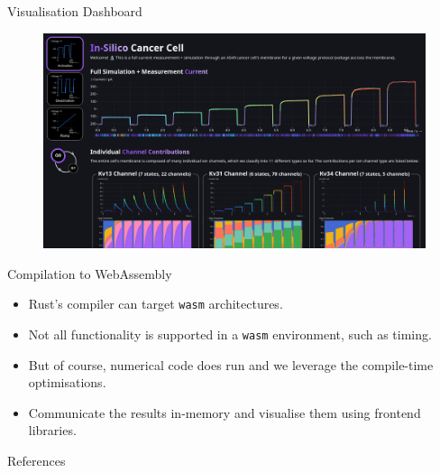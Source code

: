\documentclass[aspectratio=169, hyperref={colorlinks=true}]{beamer}
\begin{document}
  \begin{frame}{Visualisation Dashboard}
    \begin{figure}
      \includegraphics[width=0.7\linewidth]{../../figures/above-the-fold-screenshot.png}
    \end{figure}
  \end{frame}

  \begin{frame}{Compilation to WebAssembly}
    \begin{itemize}
      \item Rust's compiler can target \texttt{wasm} architectures.
      \item Not all functionality is supported in a \texttt{wasm} environment, such as timing.
      \item But of course, numerical code does run and we leverage the compile-time optimisations.
      \item Communicate the results in-memory and visualise them using frontend libraries.
    \end{itemize}
  \end{frame}

  \begin{frame}[allowframebreaks]{References}
    \printbibliography
  \end{frame}
\end{document}
